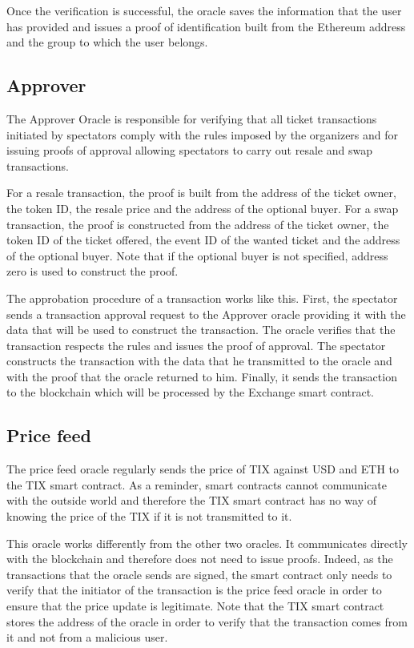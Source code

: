 \documentclass[a4paper,11pt,oneside]{report}
\begin{document}
Once the verification is successful, the oracle saves the information that the user has provided and issues a proof of identification built from the Ethereum address and the group to which the user belongs.

\subsection{Approver}
The Approver Oracle is responsible for verifying that all ticket transactions initiated by spectators comply with the rules imposed by the organizers and for issuing proofs of approval allowing spectators to carry out resale and swap transactions.

For a resale transaction, the proof is built from the address of the ticket owner, the token ID, the resale price and the address of the optional buyer. For a swap transaction, the proof is constructed from the address of the ticket owner, the token ID of the ticket offered, the event ID of the wanted ticket and the address of the optional buyer. Note that if the optional buyer is not specified, address zero is used to construct the proof.

The approbation procedure of a transaction works like this. First, the spectator sends a transaction approval request to the Approver oracle providing it with the data that will be used to construct the transaction. The oracle verifies that the transaction respects the rules and issues the proof of approval. The spectator constructs the transaction with the data that he transmitted to the oracle and with the proof that the oracle returned to him. Finally, it sends the transaction to the blockchain which will be processed by the Exchange smart contract.

\subsection{Price feed}
The price feed oracle regularly sends the price of TIX against USD and ETH to the TIX smart contract. As a reminder, smart contracts cannot communicate with the outside world and therefore the TIX smart contract has no way of knowing the price of the TIX if it is not transmitted to it.

This oracle works differently from the other two oracles. It communicates directly with the blockchain and therefore does not need to issue proofs. Indeed, as the transactions that the oracle sends are signed, the smart contract only needs to verify that the initiator of the transaction is the price feed oracle in order to ensure that the price update is legitimate. Note that the TIX smart contract stores the address of the oracle in order to verify that the transaction comes from it and not from a malicious user.
\end{document}
